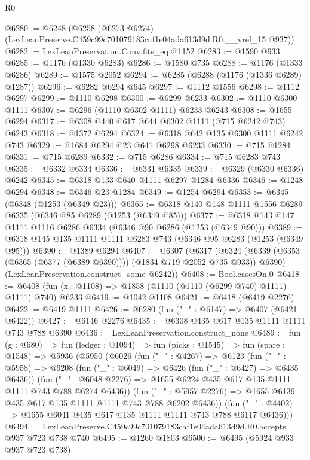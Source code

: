 \begin{lexlean}{R0}
\begin{coremodule}
@6280 := @6248
    (@6258 (@6273 @6274) (LexLeanPreserve.C459c99c701079183caf1e04ada613d9d.R0.__vrel_15 @937))
@6282 := LexLeanPreservation.Conv.fits_eq @1152
@6283 := @1590 @933
@6285 := @1176 (@1330 @6283)
@6286 := @1580 @735
@6288 := @1176 (@1333 @6286)
@6289 := @1575 @2052
@6294 := @6285 (@6288 (@1176 (@1336 @6289) @1287))
@6296 := @6282 @6294 @645
@6297 := @1112 @1556
@6298 := @1112 @6297
@6299 := @1110 @6298
@6300 := @6299 @6233
@6302 := @1110 @6300 @1111
@6307 := @6296 (@1110 @6302 @1111) @6233 @6243
@6308 := @1655 @6294
@6317 := @6308 @440 @617 @644 @6302 @1111 (@715 @6242 @743) @6243
@6318 := @1372 @6294
@6324 := @6318 @642 @135 @6300 @1111 @6242 @743
@6329 := @1684 @6294 @23 @641 @6298 @6233
@6330 := @715 @1284
@6331 := @715 @6289
@6332 := @715 @6286
@6334 := @715 @6283 @743
@6335 := @6332 @6334
@6336 := @6331 @6335
@6339 := @6329 (@6330 @6336) @6242
@6345 := @6318 @133 @640 @1111 @6297 @1284 @6336
@6346 := @1248 @6294
@6348 := @6346 @23 @1284
@6349 := @1254 @6294
@6353 := @6345 (@6348 (@1253 (@6349 @23)))
@6365 := @6318 @140 @148 @1111 @1556 @6289 @6335 (@6346 @85 @6289 (@1253 (@6349 @85)))
@6377 := @6318 @143 @147 @1111 @1116 @6286 @6334 (@6346 @90 @6286 (@1253 (@6349 @90)))
@6389 := @6318 @145 @135 @1111 @1111 @6283 @743 (@6346 @95 @6283 (@1253 (@6349 @95)))
@6390 := @1389 @6294
@6407 := @6307
    (@6317
      (@6324 (@6339 (@6353 (@6365 (@6377 (@6389 @6390)))) (@1834 @719 @2052 @735 @933)) @6390)
      (LexLeanPreservation.construct_some @6242))
@6408 := Bool.casesOn.{0}
@6418 := @6408 (fun (x : @1108) => @1858 (@1110 (@1110 (@6299 @740) @1111) @1111) @740) @6233
@6419 := @1042 @1108
@6421 := @6418 (@6419 @2276)
@6422 := @6419 @1111
@6426 := @6280 (fun ("_" : @6147) => @6407 (@6421 @6422))
@6427 := @6146 @2276
@6435 := @6308 @435 @617 @135 @1111 @1111 @743 @788 @6390
@6436 := LexLeanPreservation.construct_none
@6489 := fun (g : @680) =>
  fun (ledger : @1094) =>
  fun (picks : @1545) =>
  fun (spare : @1548) =>
  @5936
    (@5950
      (@6026
        (fun ("_" : @4267) =>
        @6123
          (fun ("_" : @5958) =>
          @6208
            (fun ("_" : @6049) => @6426 (fun ("_" : @6427) => @6435 @6436))
            (fun ("_" : @6048 @2276) =>
            @1655 @6224 @435 @617 @135 @1111 @1111 @743 @788 @6274 @6436))
          (fun ("_" : @5957 @2276) => @1655 @6139 @435 @617 @135 @1111 @1111 @743 @788 @6202 @6436))
        (fun ("_" : @4402) => @1655 @6041 @435 @617 @135 @1111 @1111 @743 @788 @6117 @6436)))
@6494 := LexLeanPreserve.C459c99c701079183caf1e04ada613d9d.R0.accepts @937 @723 @738 @740
@6495 := @1260 @1803
@6500 := @6495 (@5924 @933 @937 @723 @738)

\end{coremodule}
\end{lexlean}
